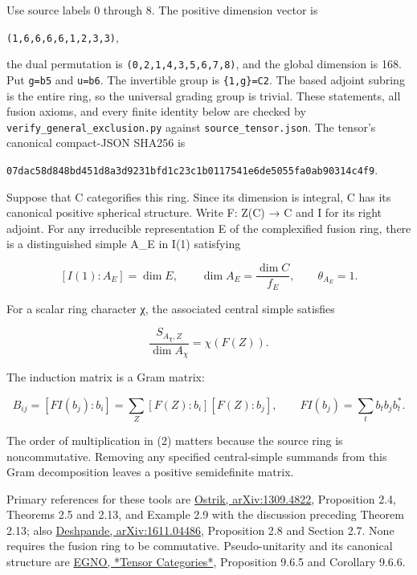 Use source labels 0 through 8. The positive dimension vector is

\texttt{(1,6,6\allowbreak{},6,6,1\allowbreak{},2,3,3\allowbreak{})},

the dual permutation is
\texttt{(0,2,1\allowbreak{},4,3,5\allowbreak{},6,7,8\allowbreak{})}, and
the global dimension is 168. Put \texttt{g=b5} and \texttt{u=b6}. The
invertible group is \texttt{\{1,g\}=\allowbreak{}C2}. The based adjoint
subring is the entire ring, so the universal grading group is trivial.
These statements, all fusion axioms, and every finite identity below are
checked by
\texttt{verify\allowbreak{}\_\allowbreak{}genera\allowbreak{}l\_\allowbreak{}exclus\allowbreak{}ion.\allowbreak{}py}
against
\texttt{source\allowbreak{}\_\allowbreak{}tensor\allowbreak{}.\allowbreak{}json}.
The tensor's canonical compact-JSON SHA256 is

\texttt{07dac5\allowbreak{}8d848b\allowbreak{}d451d8\allowbreak{}a3d923\allowbreak{}1bfd1c\allowbreak{}23c1b0\allowbreak{}117541\allowbreak{}e6de50\allowbreak{}55fa0a\allowbreak{}b90314\allowbreak{}c4f9}.

Suppose that C categorifies this ring. Since its dimension is integral,
C has its canonical positive spherical structure. Write F: Z(C) → C and
I for its right adjoint. For any irreducible representation E of the
complexified fusion ring, there is a distinguished simple A\_E in I(1)
satisfying

\[
[I(1):A_E]=\dim E,\qquad \dim A_E=\frac{\dim C}{f_E},\qquad\theta_{A_E}=1.
\]

For a scalar ring character χ, the associated central simple satisfies

\[
\frac{S_{A_\chi,Z}}{\dim A_\chi}=\chi(F(Z)). \tag{1}
\]

The induction matrix is a Gram matrix:

\[
B_{ij}=[FI(b_j):b_i]=\sum_Z [F(Z):b_i][F(Z):b_j],
\qquad FI(b_j)=\sum_t b_t b_j b_t^* . \tag{2}
\]

The order of multiplication in (2) matters because the source ring is
noncommutative. Removing any specified central-simple summands from this
Gram decomposition leaves a positive semidefinite matrix.

Primary references for these tools are
\href{https://arxiv.org/abs/1309.4822}{Ostrik, arXiv:1309.4822},
Proposition 2.4, Theorems 2.5 and 2.13, and Example 2.9 with the
discussion preceding Theorem 2.13; also
\href{https://arxiv.org/abs/1611.04486}{Deshpande, arXiv:1611.04486},
Proposition 2.8 and Section 2.7. None requires the fusion ring to be
commutative. Pseudo-unitarity and its canonical structure are
\href{https://math.mit.edu/~etingof/egnobookfinal.pdf}{EGNO, *Tensor
Categories*}, Proposition 9.6.5 and Corollary 9.6.6.

